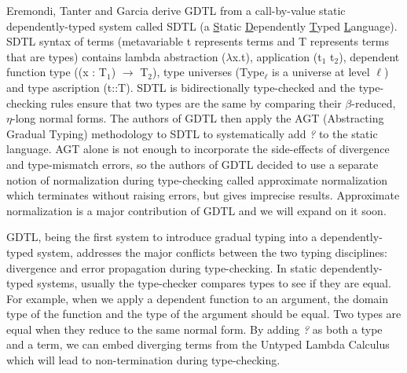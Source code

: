 \documentclass{article}
\newcommand{\Scode}[1]{{\fontfamily{cmss}\selectfont\color{Mahogany}#1}}
\newcommand{\Gcode}[1]{{\color{OliveGreen}\textit{#1}}}
\begin{document}
Eremondi, Tanter and Garcia\cite{eremondi_approximate_2019} derive GDTL from a
call-by-value static dependently-typed system called SDTL (a \underline{S}tatic
\underline{D}ependently \underline{T}yped \underline{L}anguage). SDTL syntax of
terms (metavariable \Scode{t} represents terms and \Scode{T} represents terms
that are types) contains lambda abstraction (\Scode{\(\lambda\)x.t}),
application (\Scode{t\(_1\) t\(_2\)}), dependent function type (\Scode{(x :
  T\(_1\)) \(\to\) T\(_2\)}), type universes (\Scode{Type\(_\ell\)} is a
universe at level \(\ell\)) and type ascription (\Scode{t::T}). SDTL is
bidirectionally type-checked and the type-checking rules ensure that two types
are the same by comparing their \(\beta\)-reduced, \(\eta\)-long normal forms.
The authors of GDTL then apply the AGT (Abstracting Gradual Typing)
methodology\cite{garcia_abstracting_2016} to SDTL to systematically add
\Gcode{?} to the static language. AGT alone is not enough to incorporate the
side-effects of divergence and type-mismatch errors, so the authors of GDTL
decided to use a separate notion of normalization during type-checking called
approximate normalization which terminates without raising errors, but gives
imprecise results. Approximate normalization is a major contribution of GDTL and
we will expand on it soon.

GDTL, being the first system to introduce gradual typing into a
dependently-typed system, addresses the major conflicts between the two typing
disciplines: divergence and error propagation during type-checking. In static
dependently-typed systems, usually the type-checker compares types to see if
they are equal. For example, when we apply a dependent function to an argument,
the domain type of the function and the type of the argument should be equal.
Two types are equal when they reduce to the same normal form. By adding
\Gcode{?} as both a type and a term, we can embed diverging terms from the
Untyped Lambda Calculus which will lead to non-termination during type-checking.
\end{document}
